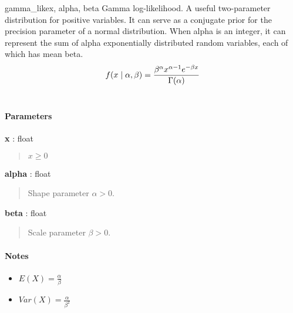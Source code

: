 \hypertarget{pymc.distributions.gamma_like}{}
\begin{funcdesc}{gamma\_like}{x, alpha, beta}
Gamma log-likelihood. A useful two-parameter distribution for positive variables. It can serve as a conjugate prior for the precision parameter of a normal distribution. When alpha is an integer, it can represent the sum of alpha exponentially distributed random variables, each of which has mean beta.
\begin{gather}
\begin{split}f(x \mid \alpha, \beta) = \frac{\beta^{\alpha}x^{\alpha-1}e^{-\beta x}}{\Gamma(\alpha)}\end{split}\notag\\\begin{split}\end{split}\notag
\end{gather}
\paragraph{Parameters}
\begin{paramlist}
\item[] \textbf{x} : float
\begin{quote}

$x \ge 0$
\end{quote}

\item[] \textbf{alpha} : float
\begin{quote}

Shape parameter $\alpha > 0$.
\end{quote}

\item[] \textbf{beta} : float
\begin{quote}

Scale parameter $\beta > 0$.
\end{quote}
\end{paramlist}
\paragraph{Notes}
\begin{itemize}
\item {}
$E(X) = \frac{\alpha}{\beta}$

\item {}
$Var(X) = \frac{\alpha}{\beta^2}$

\end{itemize}
\end{funcdesc}

